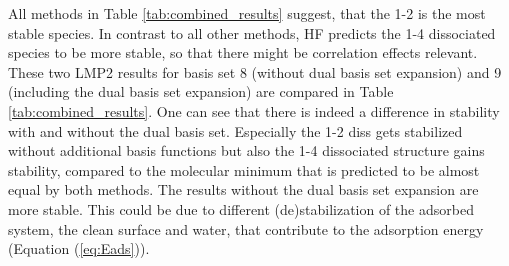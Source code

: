 \documentclass[11pt,DIV=13,BCOR=5mm,a4paper,headinclude]{scrbook}
\begin{document}
All methods in Table \ref{tab:combined_results} suggest, that the 1-2 is the most stable species.
In contrast to all other methods, HF predicts the 1-4 dissociated species to be more stable, so that there might be correlation effects relevant.
These two LMP2 results for basis set 8 (without dual basis set expansion) and 9 (including the dual basis set expansion) are compared in Table \ref{tab:combined_results}. %
One can see that there is indeed a difference in stability with and without the dual basis set.
Especially the 1-2 diss gets stabilized without additional basis functions but also the 1-4 dissociated structure gains stability, compared to the molecular minimum that is predicted to be almost equal by both methods.
The results without the dual basis set expansion are more stable.
This could be due to different (de)stabilization of the adsorbed system, the clean surface and water, that contribute to the adsorption energy (Equation (\ref{eq:Eads})). %
\end{document}
